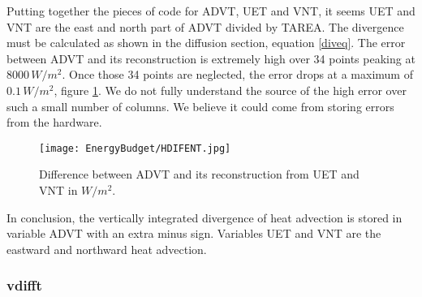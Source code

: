 Putting together the pieces of code for ADVT, UET and VNT, it seems UET and VNT are the east and north part of ADVT divided by TAREA. The divergence must be calculated as shown in the diffusion section, equation \ref{diveq}. The error between ADVT and its reconstruction is extremely high over 34 points peaking at $8000 \, W/m^2$. Once those 34 points are neglected, the error drops at a maximum of $0.1 \, W/m^2$, figure \ref{advt}. We do not fully understand the source of the high error over such a small number of columns. We believe it could come from storing errors from the hardware. 

\begin{figure}
\center
\texttt{[image: EnergyBudget/HDIFENT.jpg]}
\caption{Difference between ADVT and its reconstruction from UET and VNT in $W/m^2$.}
\label{advt}
\end{figure}

In conclusion, the vertically integrated divergence of heat advection is stored in variable ADVT with an extra minus sign. Variables UET and VNT are the eastward and northward heat advection. 

\subsubsection{vdifft}\label{vdiff}

